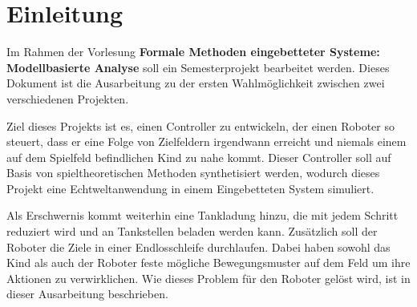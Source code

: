 \section{Einleitung}
Im Rahmen der Vorlesung \textbf{Formale Methoden eingebetteter Systeme: Modellbasierte Analyse} soll ein Semesterprojekt bearbeitet werden. Dieses Dokument ist die Ausarbeitung zu der ersten Wahlmöglichkeit zwischen zwei verschiedenen Projekten.\par

Ziel dieses Projekts ist es, einen Controller zu entwickeln, der einen Roboter so steuert, dass er eine Folge von Zielfeldern irgendwann erreicht und niemals einem auf dem Spielfeld befindlichen Kind zu nahe kommt. Dieser Controller soll auf Basis von spieltheoretischen Methoden synthetisiert werden, wodurch dieses Projekt eine Echtweltanwendung in einem Eingebetteten System simuliert.\par

Als Erschwernis kommt weiterhin eine Tankladung hinzu, die mit jedem Schritt reduziert wird und an Tankstellen beladen werden kann. Zusätzlich soll der Roboter die Ziele in einer Endlosschleife durchlaufen. Dabei haben sowohl das Kind als auch der Roboter feste mögliche Bewegungsmuster auf dem Feld um ihre Aktionen zu verwirklichen. Wie dieses Problem für den Roboter gelöst wird, ist in dieser Ausarbeitung beschrieben.



